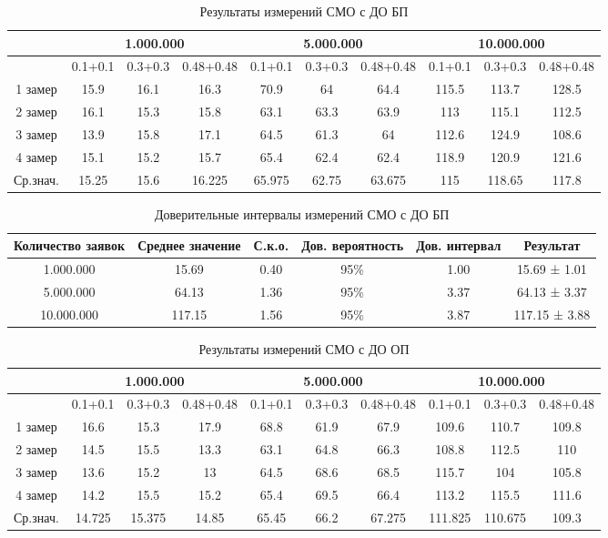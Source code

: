 \documentclass[a4paper,14pt]{report} %
\begin{document}
\begin{table}[h!]
\caption{Результаты измерений СМО с ДО БП}
\begin{tabular}{|c|c|c|c|c|c|c|c|c|c|}
\hline
 & \multicolumn{3}{|c|}{1.000.000} & \multicolumn{3}{|c|}{5.000.000} & \multicolumn{3}{|c|}{10.000.000} \\
\hline
 & 0.1+0.1 & 0.3+0.3 & 0.48+0.48 & 0.1+0.1 & 0.3+0.3 & 0.48+0.48 & 0.1+0.1 & 0.3+0.3 & 0.48+0.48 \\
\hline
1 замер & 15.9 & 16.1 & 16.3 & 70.9 & 64 & 64.4 & 115.5 & 113.7 & 128.5 \\
\hline
2 замер & 16.1 & 15.3 & 15.8 & 63.1 & 63.3 & 63.9 & 113 & 115.1 & 112.5 \\
\hline
3 замер & 13.9 & 15.8 & 17.1 & 64.5 & 61.3 & 64 & 112.6 & 124.9 & 108.6 \\
\hline
4 замер & 15.1 & 15.2 & 15.7 & 65.4 & 62.4 & 62.4 & 118.9 & 120.9 & 121.6 \\
\hline
Ср.знач. & 15.25 & 15.6 & 16.225 & 65.975 & 62.75 & 63.675 & 115 & 118.65 & 117.8 \\
\hline
\end{tabular}
\end{table} 

\begin{table}[h!]
\caption{Доверительные интервалы измерений СМО с ДО БП}
\begin{tabular}{|c|c|c|c|c|c|}
\hline
 Количество заявок & Среднее значение & С.к.о. & Дов. вероятность & Дов. интервал & Результат\\
\hline
1.000.000 & 15.69 & 0.40 & 95\% & 1.00 & 15.69 ± 1.01 \\
\hline
5.000.000 & 64.13 & 1.36 & 95\% & 3.37 & 64.13 ± 3.37 \\
\hline
10.000.000 & 117.15 & 1.56 & 95\% &3.87 & 117.15 ± 3.88 \\
\hline
\end{tabular}
\end{table} 

\begin{table}[h!]
\caption{Результаты измерений СМО с ДО ОП}
\begin{tabular}{|c|c|c|c|c|c|c|c|c|c|}
\hline
 & \multicolumn{3}{|c|}{1.000.000} & \multicolumn{3}{|c|}{5.000.000} & \multicolumn{3}{|c|}{10.000.000} \\
\hline
 & 0.1+0.1 & 0.3+0.3 & 0.48+0.48 & 0.1+0.1 & 0.3+0.3 & 0.48+0.48 & 0.1+0.1 & 0.3+0.3 & 0.48+0.48 \\
\hline
1 замер & 16.6 & 15.3 & 17.9 & 68.8 & 61.9 & 67.9 & 109.6 & 110.7 & 109.8  \\
\hline
2 замер & 14.5 & 15.5 & 13.3 & 63.1 & 64.8 & 66.3 & 108.8 & 112.5 & 110 \\
\hline
3 замер & 13.6 & 15.2 & 13 & 64.5 & 68.6 & 68.5 & 115.7 & 104 & 105.8  \\
\hline
4 замер & 14.2 & 15.5 & 15.2 & 65.4 & 69.5 & 66.4  & 113.2 & 115.5 & 111.6\\
\hline
Ср.знач. &  14.725 & 15.375 & 14.85 & 65.45 & 66.2 & 67.275 & 111.825 & 110.675 & 109.3 \\
\hline
\end{tabular}
\end{table} 
\end{document}
